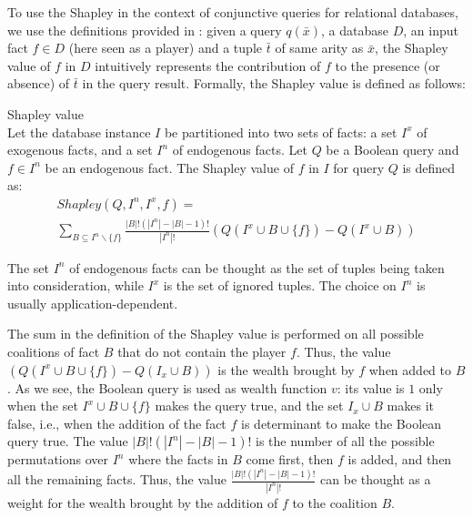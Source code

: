 \label{sec:shapley_value}

To use the Shapley in the context of conjunctive queries for relational databases, we use the definitions provided in \cite{DFKM22}:  given a query $q(\bar{x})$, a database $D$, an input fact $f \in D$ (here seen as a player) and a tuple $\bar{t}$ of same arity as $\bar{x}$, the Shapley value of $f$ in $D$ intuitively represents the contribution of $f$ to the presence (or absence) of $\bar{t}$ in the query result.
Formally, the Shapley value is defined as follows:

\begin{definition}{Shapley value \cite{DFKM22}}\\
	Let the database instance $I$ be partitioned into two sets of facts: a set $I^x$ of  exogenous facts, and a set $I^n$ of endogenous facts. Let $Q$ be a Boolean query and $f \in I^n$ be an endogenous fact. The Shapley value of $f$ in $I$ for query $Q$ is defined as:
	\begin{multline*}
		Shapley(Q, I^n, I^x, f) = \\ \sum_{B \subseteq I^n\backslash \{ f \}}\frac{|B|!(|I^n| - |B| - 1)!}{|I^n|!}  \left(Q(I^x \cup B \cup \{ f\} ) - Q(I^x \cup B)\right)
	\end{multline*}
\end{definition}

The set $I^n$ of endogenous facts can be thought as the set of tuples being taken into consideration, while $I^x$ is the set of ignored tuples. The choice on $I^n$ is usually application-dependent.

The sum in the definition of the Shapley value is performed on all possible coalitions of fact $B$ that do not contain the player $f$. Thus, the value $\left(Q(I^x \cup B \cup \{ f\} ) - Q(I_x \cup B)\right)$ is the wealth brought by $f$ when added to $B$. As we see, the Boolean query is used as wealth function $v$: its value is $1$ only when the set $I^x \cup B \cup \{ f\}$ makes the query true, and the set $I_x \cup B$ makes it false, i.e., when the addition of the fact $f$ is determinant to make the Boolean query true. 
The value $|B|!(|I^n| - |B| - 1)!$ is the number of all the possible permutations over $I^n$ where the facts in $B$ come first, then $f$ is added, and then all the remaining facts. Thus, the value $\frac{|B|!(|I^n| - |B| - 1)!}{|I^n|!}$ can be thought as a weight for the wealth brought by the addition of $f$ to the coalition $B$. 

